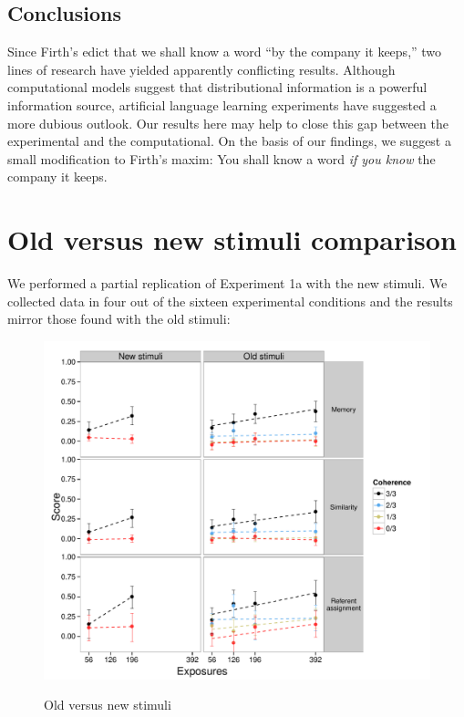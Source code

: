 \documentclass[man,longtable,floatsintext]{my-apa6}
\begin{document}
\subsection{Conclusions}

Since Firth's edict that we shall know a word ``by the company it keeps,'' two lines of research have yielded apparently conflicting results. Although computational models suggest that distributional information is a powerful information source, artificial language learning experiments have suggested a more dubious outlook. Our results here may help to close this gap between the experimental and the computational. On the basis of our findings, we suggest a small modification to Firth's maxim: You shall know a word \emph{if you know} the company it keeps.

\setcounter{secnumdepth}{0}

\newpage





\appendix
\section{Old versus new stimuli comparison}
\label{old-vs-new}

We performed a partial replication of Experiment 1a with the new stimuli. We collected data in four out of the sixteen experimental conditions and the results mirror those found with the old stimuli:
\begin{figure}
  \centering
  \includegraphics[width=0.9\linewidth]{stim-comparison} \\
  \caption{Old versus new stimuli}
  \label{fig:old-vs-new}
\end{figure}
\end{document}
